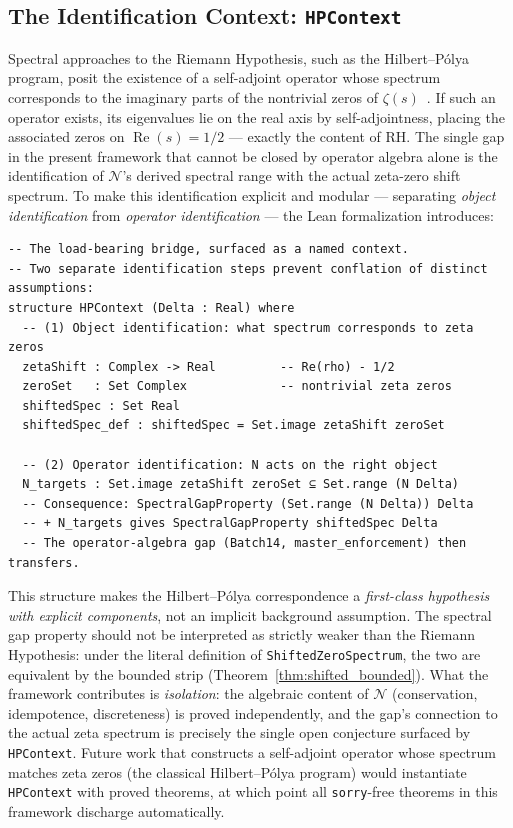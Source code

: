 \documentclass[12pt, a4paper]{article}
\theoremstyle{plain}
\theoremstyle{definition}
\newcommand{\N}{\mathcal{N}}
\newcommand{\re}{\operatorname{Re}}
\newcommand{\lean}[1]{\texttt{#1}}
\begin{document}
\subsection{The Identification Context: \lean{HPContext}}
\label{sec:hpcontext}

Spectral approaches to the Riemann Hypothesis, such as the
Hilbert--P\'{o}lya program, posit the existence of a self-adjoint operator
whose spectrum corresponds to the imaginary parts of the nontrivial zeros of
$\zeta(s)$~\cite{montgomery1973,goldston2001}.
If such an operator exists, its eigenvalues lie on the real axis by
self-adjointness, placing the associated zeros on $\re(s) = 1/2$ --- exactly
the content of RH.
The single gap in the present framework that cannot be closed by operator
algebra alone is the identification of $\N$'s derived spectral range with the
actual zeta-zero shift spectrum.
To make this identification explicit and modular --- separating \emph{object
identification} from \emph{operator identification} --- the Lean formalization
introduces:

\begin{lstlisting}[language=Lean4]
-- The load-bearing bridge, surfaced as a named context.
-- Two separate identification steps prevent conflation of distinct assumptions:
structure HPContext (Delta : Real) where
  -- (1) Object identification: what spectrum corresponds to zeta zeros
  zetaShift : Complex -> Real         -- Re(rho) - 1/2
  zeroSet   : Set Complex             -- nontrivial zeta zeros
  shiftedSpec : Set Real
  shiftedSpec_def : shiftedSpec = Set.image zetaShift zeroSet

  -- (2) Operator identification: N acts on the right object  
  N_targets : Set.image zetaShift zeroSet ⊆ Set.range (N Delta)
  -- Consequence: SpectralGapProperty (Set.range (N Delta)) Delta
  -- + N_targets gives SpectralGapProperty shiftedSpec Delta
  -- The operator-algebra gap (Batch14, master_enforcement) then transfers.
\end{lstlisting}

This structure makes the Hilbert--P\'{o}lya correspondence a
\emph{first-class hypothesis with explicit components}, not an implicit
background assumption.
The spectral gap property should not be interpreted as strictly weaker than
the Riemann Hypothesis: under the literal definition of
\lean{ShiftedZeroSpectrum}, the two are equivalent by the bounded strip
(Theorem~\ref{thm:shifted_bounded}).
What the framework contributes is \emph{isolation}: the algebraic content
of $\N$ (conservation, idempotence, discreteness) is proved independently,
and the gap's connection to the actual zeta spectrum is precisely the
single open conjecture surfaced by \lean{HPContext}.
Future work that constructs a self-adjoint operator whose spectrum
matches zeta zeros (the classical Hilbert--P\'{o}lya program) would
instantiate \lean{HPContext} with proved theorems, at which point all
\lean{sorry}-free theorems in this framework discharge automatically.
\end{document}
